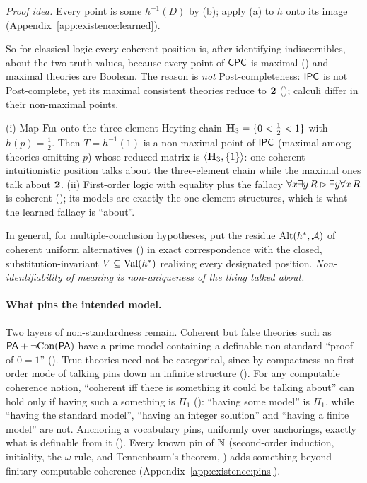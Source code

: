 \emph{Proof idea.} Every point is some $h^{-1}(D)$ by (b); apply (a) to $h$ onto its image (Appendix~\ref{app:existence:learned}).

So for classical logic every coherent position is, after identifying indiscernibles, about the two truth values, because every point of $\mathsf{CPC}$ is maximal () and maximal theories are Boolean. The reason is \emph{not} Post-completeness: $\mathsf{IPC}$ is not Post-complete, yet its maximal consistent theories reduce to $\mathbf{2}$ (); calculi differ in their non-maximal points.

\begin{example}\label{ex:existence:residue}
\textup{(i)} Map $\mathrm{Fm}$ onto the three-element Heyting chain $\mathbf{H}_3=\{0<\frac12<1\}$ with $h(p)=\frac12$. Then $T=h^{-1}(1)$ is a non-maximal point of $\mathsf{IPC}$ (maximal among theories omitting $p$) whose reduced matrix is $\langle\mathbf{H}_3,\{1\}\rangle$: one coherent intuitionistic position talks about the three-element chain while the maximal ones talk about $\mathbf{2}$. \textup{(ii)} First-order logic with equality plus the fallacy $\forall x\exists y\,R\rhd\exists y\forall x\,R$ is coherent (); its models are exactly the one-element structures, which is what the learned fallacy is ``about''.
\end{example}

In general, for multiple-conclusion hypotheses,  put the residue $\mathrm{Alt}(h^{*},\mathcal{A})$ of coherent uniform alternatives () in exact correspondence with the closed, substitution-invariant $V\subseteq\mathrm{Val}(h^{*})$ realizing every designated position. \emph{Non-identifiability of meaning is non-uniqueness of the thing talked about.}

\paragraph{What pins the intended model.} Two layers of non-standardness remain. Coherent but false theories such as $\mathsf{PA}+\neg\mathrm{Con}(\mathsf{PA})$ have a prime model containing a definable non-standard ``proof of $0=1$'' (). True theories need not be categorical, since by compactness no first-order mode of talking pins down an infinite structure (). For any computable coherence notion, ``coherent iff there is something it could be talking about'' can hold only if having such a something is $\Pi_1$ (): ``having some model'' is $\Pi_1$, while ``having the standard model'', ``having an integer solution'' and ``having a finite model'' are not. Anchoring a vocabulary pins, uniformly over anchorings, exactly what is definable from it (). Every known pin of $\mathbb{N}$ (second-order induction, initiality, the $\omega$-rule, and Tennenbaum's theorem, ) adds something beyond finitary computable coherence (Appendix~\ref{app:existence:pins}).


